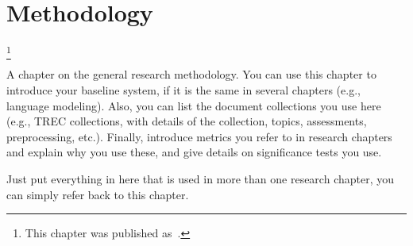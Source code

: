 
\chapter{Methodology}
\label{chapter:methodology}

\footnote[]{This chapter was published as~\citep{...}.}
\acresetall

A chapter on the general research methodology. You can use this chapter to introduce your baseline system, if it is the same in several chapters (e.g., language modeling). Also, you can list the document collections you use here (e.g., TREC collections, with details of the collection, topics, assessments, preprocessing, etc.). Finally, introduce metrics you refer to in research chapters and explain why you use these, and give details on significance tests you use.

Just put everything in here that is used in more than one research chapter, you can simply refer back to this chapter.
